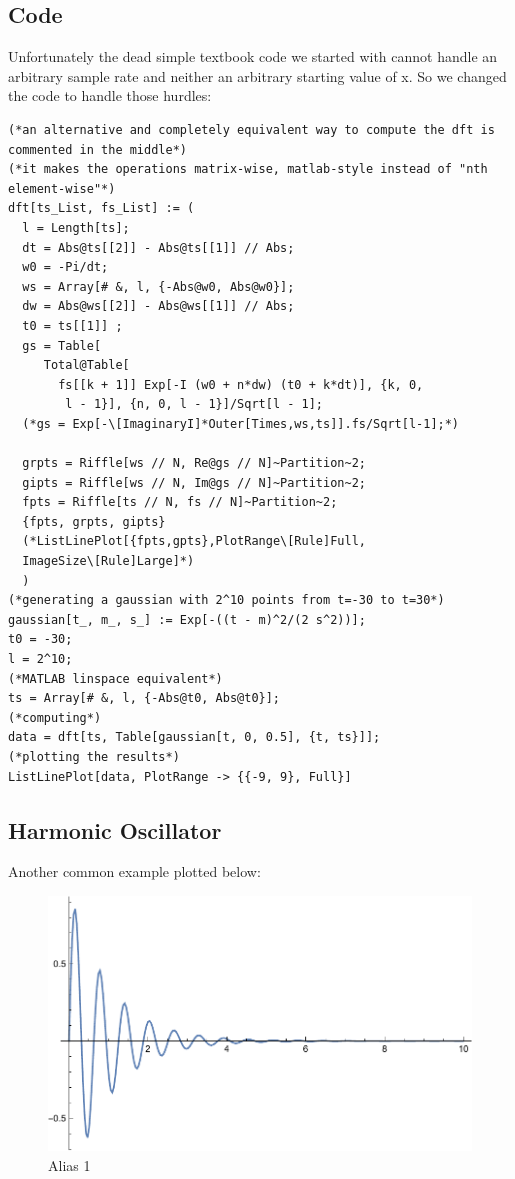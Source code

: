 \documentclass[titlepage]{article}
\begin{document}
\subsection{Code}
Unfortunately the dead simple textbook code we started with cannot handle an arbitrary sample rate and neither an arbitrary starting value of x. So we changed the code to handle those hurdles:
\begin{verbatim}
(*an alternative and completely equivalent way to compute the dft is commented in the middle*)
(*it makes the operations matrix-wise, matlab-style instead of "nth element-wise"*)
dft[ts_List, fs_List] := (
  l = Length[ts]; 
  dt = Abs@ts[[2]] - Abs@ts[[1]] // Abs;
  w0 = -Pi/dt;
  ws = Array[# &, l, {-Abs@w0, Abs@w0}];
  dw = Abs@ws[[2]] - Abs@ws[[1]] // Abs;
  t0 = ts[[1]] ;
  gs = Table[
     Total@Table[
       fs[[k + 1]] Exp[-I (w0 + n*dw) (t0 + k*dt)], {k, 0, 
        l - 1}], {n, 0, l - 1}]/Sqrt[l - 1];
  (*gs = Exp[-\[ImaginaryI]*Outer[Times,ws,ts]].fs/Sqrt[l-1];*)
  
  grpts = Riffle[ws // N, Re@gs // N]~Partition~2;
  gipts = Riffle[ws // N, Im@gs // N]~Partition~2;
  fpts = Riffle[ts // N, fs // N]~Partition~2;
  {fpts, grpts, gipts}
  (*ListLinePlot[{fpts,gpts},PlotRange\[Rule]Full,
  ImageSize\[Rule]Large]*)
  )
(*generating a gaussian with 2^10 points from t=-30 to t=30*)
gaussian[t_, m_, s_] := Exp[-((t - m)^2/(2 s^2))];
t0 = -30;
l = 2^10;
(*MATLAB linspace equivalent*)
ts = Array[# &, l, {-Abs@t0, Abs@t0}];
(*computing*)
data = dft[ts, Table[gaussian[t, 0, 0.5], {t, ts}]];
(*plotting the results*)
ListLinePlot[data, PlotRange -> {{-9, 9}, Full}]
\end{verbatim}

\subsection{Harmonic Oscillator}

Another common example plotted below:

\begin{figure}[ht]
\centering
\includegraphics[scale=0.8,center]{images/osch.pdf}
\caption{Alias 1}
\label{fig:2d}
\end{figure}
\FloatBarrier
\end{document}
